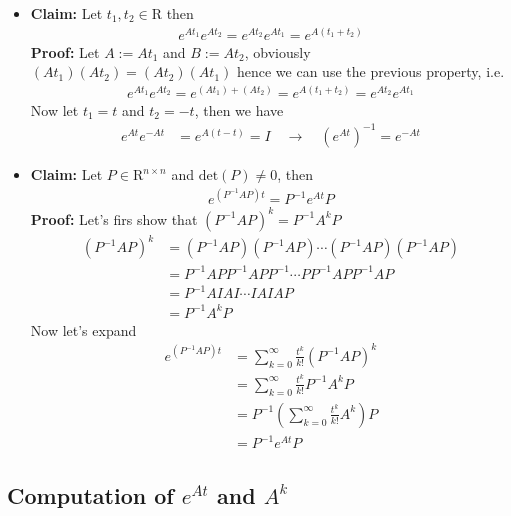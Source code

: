 \documentclass[twoside]{article}
\begin{document}
\begin{itemize}
\item \textbf{Claim:} Let $t_1 , t_2 \in \mathrm{R}$ then
%
\begin{align*}
  e^{A t_1} e^{A t_2} = e^{A t_2} e^{A t_1} = e^{A \left( t_1 + t_2 \right)}
\end{align*}
%
\textbf{Proof:} Let $A := A t_1$ and $B := A t_2$, obviously $(A t_1) (A t_2) = (A t_2) (A t_1)$ hence we can use the 
previous property, i.e. 
%
\begin{align*}
e^{A t_1} e^{A t_2} = e^{ \left( A t_1 \right) +  \left( A  t_2 \right)}
= e^{A \left( t_1 + t_2 \right)} = e^{A t_2} e^{A t_1} 
%
\end{align*}
%
Now let $t_1 = t$ and $t_2 = -t$, then we have
%
\begin{align*}
	e^{A t} e^{-A t} &= e^{A (t - t)} = I \quad \rightarrow \quad
                           \left( e^{A t} \right)^{-1} = e^{-A t}
\end{align*}

\item \textbf{Claim:} Let $P \in \mathrm{R}^{n \times n}$ and
 $\mathrm{det}(P) \neq 0$, then
%
\begin{align*}
	e^{\left(P^{-1} A P \right) t} = P^{-1} e^{A t} P
\end{align*}
%
\textbf{Proof:} Let's firs show that $ \left(P^{-1} A P \right)^k  = P^{-1} A^k P $
%
\begin{align*}
	\left(P^{-1} A P \right)^k &= \left(P^{-1} A P \right) \left(P^{-1} A P \right) \cdots \left(P^{-1} A P \right) \left(P^{-1} A P \right)
	\\
	&= P^{-1} A P P^{-1} A P P^{-1} \cdots P P^{-1} A P P^{-1} A P 
	\\
	&= P^{-1} A I A I \cdots I A I A P 
	\\
	&= P^{-1} A^k P
\end{align*}
%
Now let's expand
%
\begin{align*}
	e^{\left(P^{-1} A P \right) t} &= \sum\limits_{k=0}^{\infty} \frac{t^k}{k!} \left(P^{-1} A P \right)^k
	\\
	&= \sum\limits_{k=0}^{\infty} \frac{t^k}{k!} P^{-1} A^k P 
	\\
	&= P^{-1} \left(  \sum\limits_{k=0}^{\infty} \frac{t^k}{k!}  A^k \right) P 
	\\
	&= P^{-1} e^{A t} P
\end{align*}

\end{itemize}

\subsection{Computation of $e^{At}$ and $A^k$}
\end{document}

